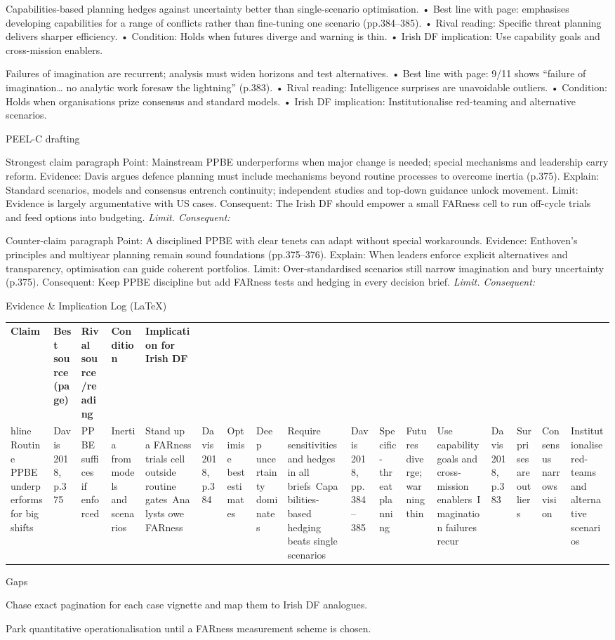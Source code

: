 Capabilities-based planning hedges against uncertainty better than single-scenario optimisation.
• Best line with page: emphasises developing capabilities for a range of conflicts rather than fine-tuning one scenario (pp.384–385).
• Rival reading: Specific threat planning delivers sharper efficiency.
• Condition: Holds when futures diverge and warning is thin.
• Irish DF implication: Use capability goals and cross-mission enablers.

Failures of imagination are recurrent; analysis must widen horizons and test alternatives.
• Best line with page: 9/11 shows “failure of imagination… no analytic work foresaw the lightning” (p.383).
• Rival reading: Intelligence surprises are unavoidable outliers.
• Condition: Holds when organisations prize consensus and standard models.
• Irish DF implication: Institutionalise red-teaming and alternative scenarios.

PEEL-C drafting

Strongest claim paragraph
Point: Mainstream PPBE underperforms when major change is needed; special mechanisms and leadership carry reform.
Evidence: Davis argues defence planning must include mechanisms beyond routine processes to overcome inertia (p.375).
Explain: Standard scenarios, models and consensus entrench continuity; independent studies and top-down guidance unlock movement.
Limit: Evidence is largely argumentative with US cases.
Consequent: The Irish DF should empower a small FARness cell to run off-cycle trials and feed options into budgeting. \textit{Limit. Consequent:}

Counter-claim paragraph
Point: A disciplined PPBE with clear tenets can adapt without special workarounds.
Evidence: Enthoven’s principles and multiyear planning remain sound foundations (pp.375–376).
Explain: When leaders enforce explicit alternatives and transparency, optimisation can guide coherent portfolios.
Limit: Over-standardised scenarios still narrow imagination and bury uncertainty (p.375).
Consequent: Keep PPBE discipline but add FARness tests and hedging in every decision brief. \textit{Limit. Consequent:}

Evidence & Implication Log (LaTeX)

\usepackage{array}
\begin{tabular}{p{3.2cm}p{4.2cm}p{3.6cm}p{3.2cm}p{4.2cm}}
	\textbf{Claim} & \textbf{Best source (page)} & \textbf{Rival source/reading} & \textbf{Condition} & \textbf{Implication for Irish DF}\\hline
	Routine PPBE underperforms for big shifts & Davis 2018, p.375 & PPBE suffices if enforced & Inertia from models and scenarios & Stand up a FARness trials cell outside routine gates\
	Analysts owe FARness & Davis 2018, p.384 & Optimise best estimates & Deep uncertainty dominates & Require sensitivities and hedges in all briefs\
	Capabilities-based hedging beats single scenarios & Davis 2018, pp.384–385 & Specific-threat planning & Futures diverge; warning thin & Use capability goals and cross-mission enablers\
	Imagination failures recur & Davis 2018, p.383 & Surprises are outliers & Consensus narrows vision & Institutionalise red-teams and alternative scenarios\
\end{tabular}

Gaps

Chase exact pagination for each case vignette and map them to Irish DF analogues.

Park quantitative operationalisation until a FARness measurement scheme is chosen.